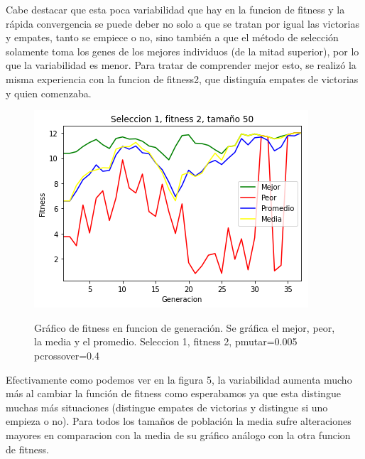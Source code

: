 \documentclass[A4paper,oneside,fleqn,11pt]{article}
\theoremstyle{definition}
\begin{document}
Cabe destacar que esta poca variabilidad que hay en la funcion de fitness y la rápida convergencia se puede deber no solo a que se tratan por igual las victorias y empates, tanto se empiece o no, sino también a que el método de selección solamente toma los genes de los mejores individuos (de la mitad superior), por lo que la variabilidad es menor. Para tratar de comprender mejor esto, se realizó la misma experiencia con la funcion de fitness2, que distinguía empates de victorias y quien comenzaba.





\begin{figure}[H]
	\captionsetup[subfigure]{position=b}
	\centering
		{\includegraphics[width=0.3\linewidth]{s1f2t50.png}}
	\caption{Gráfico de fitness en funcion de generación. Se gráfica el mejor, peor, la media y el promedio. Seleccion 1, fitness 2, pmutar=0.005 pcrossover=0.4}
\end{figure}

Efectivamente como podemos ver en la figura 5, la variabilidad aumenta mucho más al cambiar la función de fitness como esperabamos ya que esta distingue muchas más situaciones (distingue empates de victorias y distingue si uno empieza o no). Para todos los tamaños de población la media sufre alteraciones mayores en comparacion con la media de su gráfico análogo con la otra funcion de fitness.
\end{document}
